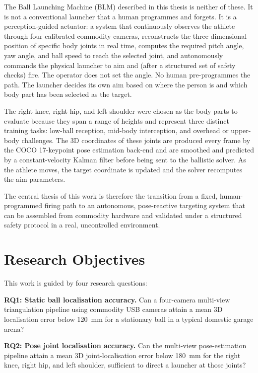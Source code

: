 The Ball Launching Machine (BLM) described in this thesis is neither of these. It is not a conventional launcher that a human programmes and forgets. It is a perception-guided actuator: a system that continuously observes the athlete through four calibrated commodity cameras, reconstructs the three-dimensional position of specific body joints in real time, computes the required pitch angle, yaw angle, and ball speed to reach the selected joint, and autonomously commands the physical launcher to aim and (after a structured set of safety checks) fire. The operator does not set the angle. No human pre-programmes the path. The launcher decides its own aim based on where the person is and which body part has been selected as the target.

The right knee, right hip, and left shoulder were chosen as the body parts to evaluate because they span a range of heights and represent three distinct training tasks: low-ball reception, mid-body interception, and overhead or upper-body challenges. The 3D coordinates of these joints are produced every frame by the COCO 17-keypoint pose estimation back-end and are smoothed and predicted by a constant-velocity Kalman filter before being sent to the ballistic solver. As the athlete moves, the target coordinate is updated and the solver recomputes the aim parameters.

The central thesis of this work is therefore the transition from a fixed, human-programmed firing path to an autonomous, pose-reactive targeting system that can be assembled from commodity hardware and validated under a structured safety protocol in a real, uncontrolled environment.

\section{Research Objectives}

This work is guided by four research questions:

\textbf{RQ1: Static ball localisation accuracy.} Can a four-camera multi-view triangulation pipeline using commodity USB cameras attain a mean 3D localisation error below 120~mm for a stationary ball in a typical domestic garage arena?

\textbf{RQ2: Pose joint localisation accuracy.} Can the multi-view pose-estimation pipeline attain a mean 3D joint-localisation error below 180~mm for the right knee, right hip, and left shoulder, sufficient to direct a launcher at those joints?

